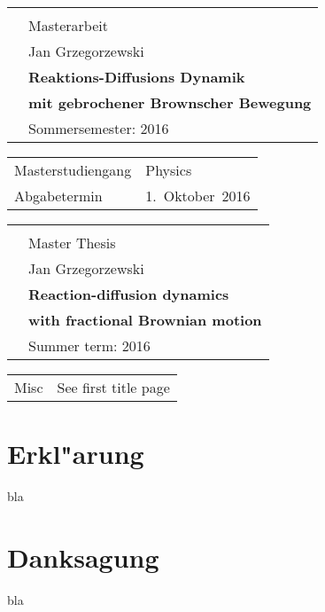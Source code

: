 \documentclass[
  a4paper,BCOR10mm,oneside,
  bibtotoc,idxtotoc,
  headsepline,footsepline,%
  fleqn,openbib
]{scrbook}
\begin{document}
\frontmatter%
\begin{titlepage}
  \raggedright%
  \null%
  \vspace{4\baselineskip}
  \setlength{\arrayrulewidth}{1pt}%
  \sffamily
  \begin{tabular}{|ll@{}}
    & \\[\baselineskip]
    & \large Masterarbeit\\
    & \large Jan Grzegorzewski \\[\baselineskip]
    & \huge\textbf{Reaktions-Diffusions Dynamik}\\
    & \huge\textbf{mit gebrochener Brownscher Bewegung}\\[\baselineskip]
    & \large Sommersemester: 2016\\[2\baselineskip]
  \end{tabular}
  \vfill
  \begin{tabular}{@{}l@{:~}l@{}}
    Masterstudiengang & Physics \\
    Abgabetermin & 1.~Oktober~2016
  \end{tabular}
  \newpage\null\thispagestyle{empty}
  \vspace{4\baselineskip}
  \begin{tabular}{|ll@{}}
    & \\[\baselineskip]
    & \large Master Thesis\\
    & \large Jan Grzegorzewski \\[\baselineskip]
    & \huge\textbf{Reaction-diffusion dynamics} \\
    & \huge\textbf{with fractional Brownian motion}\\[\baselineskip]
    & \large Summer term: 2016\\[2\baselineskip]
  \end{tabular}
  \vfill
  \begin{tabular}{@{}l@{:~}l@{}}
    Misc & See first title page
  \end{tabular}
\end{titlepage}

\tableofcontents
\listoffigures
\listoftables

\mainmatter
{}
\chapter*{Erkl"arung}\thispagestyle{empty}
bla
\chapter*{Danksagung}\thispagestyle{empty}
bla
\end{document}
